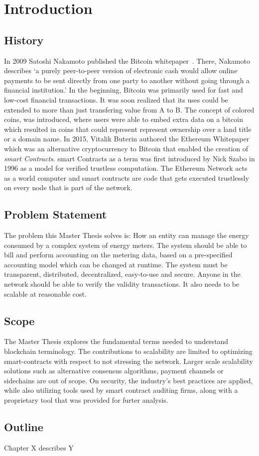 \chapter{Introduction}
\section{History}
In 2009 Satoshi Nakamoto published the Bitcoin whitepaper~\cite{bitcoin}. There, Nakamoto describes `a purely peer-to-peer version of electronic cash would allow online payments to be sent directly from one party to another without going through a financial institution.'
In the beginning, Bitcoin was primarily used for fast and low-cost financial transactions. It was soon realized that its uses could be extended to more than just transfering value from A to B. The concept of colored coins, \cite{colored} was introduced, where users were able to embed extra data on a bitcoin which resulted in coins that could represent represent ownership over a land title or a domain name. In 2015, Vitalik Buterin authored the Ethereum Whitepaper \cite{vitalik} which was an alternative cryptocurrency to Bitcoin that enabled the creation of \textit{smart Contracts}. smart Contracts as a term was first introduced by Nick Szabo in 1996 \cite{szabo} as a model for verified trustless computation. The Ethereum Network acts as a world computer and smart contracts are code that gets executed trustlessly on every node that is part of the network. 

\section{Problem Statement}
The problem this Master Thesis solves is:
How an entity can manage the energy consumed by a complex system of energy meters.
The  system should be able to bill and perform accounting on the metering data, based on a pre-specified accounting model which can be changed at runtime.
The system must be transparent, distributed, decentralized, easy-to-use and secure.
Anyone in the network should be able to verify the validity transactions.
It also needs to be scalable at reasonable cost.

\section{Scope}
The Master Thesis explores the fundamental terms needed to understand blockchain terminology. The contributions to scalability are limited to optimizing smart-contracts with respect to not stressing the network. Larger scale scalability solutions such as alternative consensus algorithms, payment channels or sidechains are out of scope. On security, the industry's best practices are applied, while also utilizing tools used by smart contract auditing firms, along with a proprietary tool that was provided for furter analysis.

\section{Outline}
Chapter X describes Y